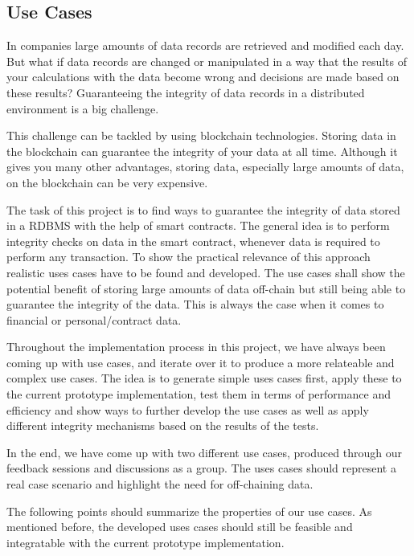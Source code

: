 \subsection{Use Cases} \label{sssec:use_cases}

In companies large amounts of data records are retrieved and modified each day. But what if data records are changed or manipulated in a way that the results of your calculations with the data become wrong and decisions are made based on these results? Guaranteeing the integrity of data records in a distributed environment is a big challenge.

This challenge can be tackled by using blockchain technologies. Storing data in the blockchain can guarantee the integrity of your data at all time. Although it gives you many other advantages, storing data, especially large amounts of data, on the blockchain can be very expensive.

The task of this project is to find ways to guarantee the integrity of data stored in a RDBMS with the help of smart contracts. The general idea is to perform integrity checks on data in the smart contract, whenever data is required to perform any transaction. To show the practical relevance of this approach realistic uses cases have to be found and developed. The use cases shall show the potential benefit of storing large amounts of data off-chain but still being able to guarantee the integrity of the data. This is always the case when it comes to financial or personal/contract data.

Throughout the implementation process in this project, we have always been coming up with use cases, and iterate over it to produce a more relateable and complex use cases. The idea is to generate simple uses cases first, apply these to the current prototype implementation, test them in terms of performance and efficiency and show ways to further develop the use cases as well as apply different integrity mechanisms based on the results of the tests.

In the end, we have come up with two different use cases, produced through our feedback sessions and discussions as a group. The uses cases should represent a real case scenario and highlight the need for off-chaining data.

The following points should summarize the properties of our use cases. As mentioned before, the developed uses cases should still be feasible and integratable with the current prototype implementation. 

